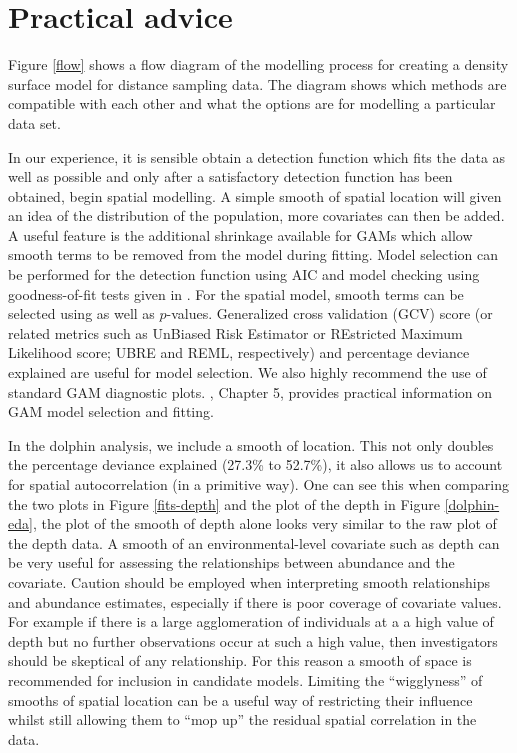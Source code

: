 \documentclass[a4paper,12pt]{article}
\begin{document}
\section*{Practical advice}
\label{s:practical}

Figure \ref{flow} shows a flow diagram of the modelling process for creating a density surface model for distance sampling data. The diagram shows which methods are compatible with each other and what the options are for modelling a particular data set.

In our experience, it is sensible obtain a detection function which fits the data as well as possible and only after a satisfactory detection function has been obtained, begin spatial modelling. A simple smooth of spatial location will given an idea of the distribution of the population, more covariates can then be added. A useful feature is the additional shrinkage available for GAMs which allow smooth terms to be removed from the model during fitting. Model selection can be performed for the detection function using AIC and model checking using goodness-of-fit tests given in \cite{Buckland:2004ts}. For the spatial model, smooth terms can be selected using as well as $p$-values. Generalized cross validation (GCV) score (or related metrics such as UnBiased Risk Estimator or REstricted Maximum Likelihood score; UBRE and REML, respectively) and percentage deviance explained are useful for model selection. We also highly recommend the use of standard GAM diagnostic plots. \cite{Wood:2006wz}, Chapter 5, provides practical information on GAM model selection and fitting.

In the dolphin analysis, we include a smooth of location. This not only doubles the percentage deviance explained (27.3\% to 52.7\%), it also allows us to account for spatial autocorrelation (in a primitive way). One can see this when comparing the two plots in Figure \ref{fits-depth} and the plot of the depth in Figure \ref{dolphin-eda}, the plot of the smooth of depth alone looks very similar to the raw plot of the depth data. A smooth of an environmental-level covariate such as depth can be very useful for assessing the relationships between abundance and the covariate. Caution should be employed when interpreting smooth relationships and abundance estimates, especially if there is poor coverage of covariate values. For example if there is a large agglomeration of individuals at a a high value of depth but no further observations occur at such a high value, then investigators should be skeptical of any relationship. For this reason a smooth of space is recommended for inclusion in candidate models. Limiting the ``wigglyness'' of smooths of spatial location can be a useful way of restricting their influence whilst still allowing them to ``mop up'' the residual spatial correlation in the data.
\end{document}
